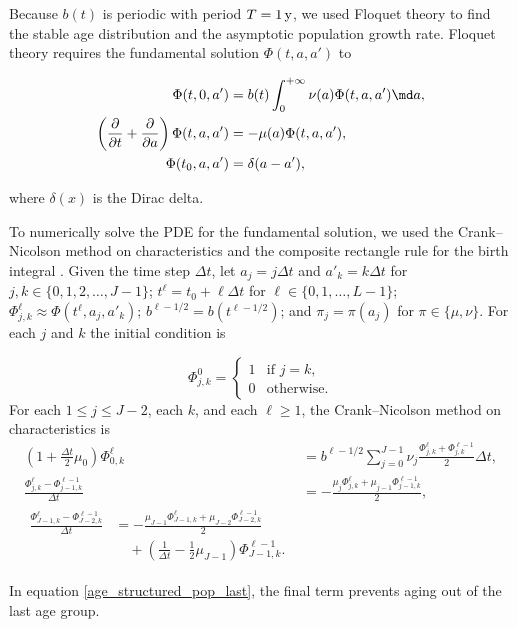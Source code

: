 \documentclass{jpmarticle}
\let\subequationsorig\subequations%
\let\endsubequationsorig\endsubequations%
\renewenvironment{subequations}{
  \subequationsorig
  \renewcommand{\theequation}{\theparentequation.\arabic{equation}}
}{
  \endsubequationsorig
}
\begin{document}
Because $b(t)$ is periodic with period $T = \unit[1]{y}$, we used
Floquet theory \autocite{parker_1992} to find the stable age
distribution and the asymptotic population growth rate. Floquet theory
requires the fundamental solution $\Phi(t, a, a')$ to
\begin{subequations}
  \begin{align}
    \Phi(t, 0, a')
    &= b(t) \int_0^{+\infty} \nu(a) \Phi(t, a, a') \md a,
    \\
    \left(\frac{\partial}{\partial t}
      + \frac{\partial}{\partial a}\right)
    \Phi(t, a, a')
    &= - \mu(a) \Phi(t, a, a'),
    \\
    \Phi(t_0, a, a')
    &= \delta(a - a'),
  \end{align}
\end{subequations}
where $\delta(x)$ is the Dirac delta.

To numerically solve the PDE for the fundamental solution, we used the
Crank--Nicolson method on characteristics and the composite rectangle
rule for the birth integral \autocite{milner_1992}.  Given the time
step $\Delta t$, let $a_j = j \Delta t$ and $a'_k = k \Delta t$ for
$j, k \in \{0, 1, 2, \ldots, J - 1\}$;
$t^{\ell} = t_0 + \ell \Delta t$ for
$\ell \in \{0, 1, \ldots, L - 1\}$;
$\Phi_{j, k}^{\ell} \approx \Phi(t^{\ell}, a_j, a'_k)$;
$b^{\ell - 1 / 2} = b(t^{\ell - 1 / 2})$; and
$\pi_j = \pi(a_j)$ for $\pi \in \{\mu, \nu\}$.
For each $j$ and $k$ the initial condition is
\begin{subequations}
  \begin{equation}
    \Phi_{j, k}^0 =
    \begin{cases}
      1 & \text{if $j = k$}, \\
      0 & \text{otherwise}.
    \end{cases}
  \end{equation}
  For each $1 \leq j \leq J - 2$, each $k$, and each $\ell
  \geq 1$, the Crank--Nicolson method on characteristics is
  \begin{align}
    \left(1 + \frac{\Delta t}{2} \mu_0\right)
    \Phi_{0, k}^{\ell}
    &= b^{\ell - 1 / 2}
    \sum_{j = 0}^{J - 1}
    \nu_j \frac{\Phi_{j, k}^{\ell} + \Phi_{j, k}^{\ell - 1}}{2}
    \Delta t,
    \\
    \frac{\Phi_{j, k}^{\ell} - \Phi_{j - 1, k}^{\ell - 1}}{\Delta t}
    &= - \frac{\mu_j \Phi_{j, k}^{\ell}
      + \mu_{j - 1} \Phi_{j - 1, k}^{\ell - 1}}{2},
    \\
    \begin{split}
      \frac{\Phi_{J - 1, k}^{\ell} - \Phi_{J - 2, k}^{\ell - 1}}{\Delta t}
      &= - \frac{\mu_{J - 1} \Phi_{J - 1, k}^{\ell}
        + \mu_{J - 2} \Phi_{J - 2, k}^{\ell - 1}}{2}
      \\
      & \quad {}
      + \left(\frac{1}{\Delta t} - \frac{1}{2} \mu_{J - 1}\right)
      \Phi_{J - 1, k}^{\ell - 1}.
    \end{split}
    \label{age_structured_pop_last}
  \end{align}
\end{subequations}
In equation \eqref{age_structured_pop_last}, the final term prevents
aging out of the last age group.
\end{document}
